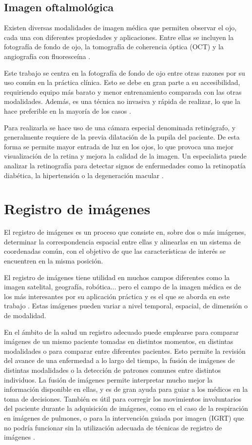 \subsection{Imagen oftalmológica}
\label{subsec:Imaxe oftalmolóxica}
Existen diversas modalidades de imagen médica que permiten observar el ojo, cada una con diferentes propiedades y aplicaciones.
Entre ellas se incluyen la fotografía de fondo de ojo, la tomografía de coherencia óptica (OCT) y la angiografía con fluoresceína \cite{ilginis2014ophthalmic}.

Este trabajo se centra en la fotografía de fondo de ojo entre otras razones por su uso común en la práctica clínica.
Esto se debe en gran parte a su accesibilidad, requiriendo equipo más barato y menor entrenamiento comparada con las otras modalidades.
Además, es una técnica no invasiva y rápida de realizar, lo que la hace preferible en la mayoría de los casos \cite{retinimaging}.

Para realizarla se hace uso de una cámara especial denominada retinógrafo, y generalmente requiere de la previa dilatación de la pupila del paciente.
De esta forma se permite mayor entrada de luz en los ojos, lo que provoca una mejor visualización de la retina y mejora la calidad de la imagen.
Un especialista puede analizar la retinografía para detectar signos de enfermedades como la retinopatía diabética, la hipertensión o la degeneración macular \cite{retreggood}.

\section{Registro de imágenes}
\label{sec:Rexistro de imaxes}
El registro de imágenes es un proceso que consiste en, sobre dos o más imágenes, determinar la correspondencia espacial entre ellas
y alinearlas en un sistema de coordenadas común, con el objetivo de que las características de interés se encuentren en la misma posición.

El registro de imágenes tiene utilidad en muchos campos diferentes como la imagen satelital, geografía, robótica... pero el
campo de la imagen médica es de los más interesantes por su aplicación práctica y es el que se aborda en este trabajo \cite{goshtasby2017theory}.
Estas imágenes pueden variar a nivel temporal, espacial, de dimensión o de modalidad.

En el ámbito de la salud un registro adecuado puede emplearse para comparar imágenes de un mismo paciente tomadas en distintos momentos, en distintas modalidades o para comparar entre diferentes pacientes.
Esto permite la revisión del avance de una enfermedad a lo largo del tiempo, la fusión de imágenes de distintas modalidades o la detección de patrones comunes entre distintos individuos.
La fusión de imágenes permite interpretar mucho mejor la información disponible en ellas, y es de gran ayuda para guiar a los médicos en la toma de decisiones.
También es útil para corregir los movimientos involuntarios del paciente durante la adquisición de imágenes, como en el caso de la respiración en imágenes de pulmones, o para la intervención guiada por imagen (\gls{IGRT}) que no
podría funcionar sin la utilización adecuada de técnicas de registro de imágenes \cite{wang2022neuralrenderingstereo3d}.


